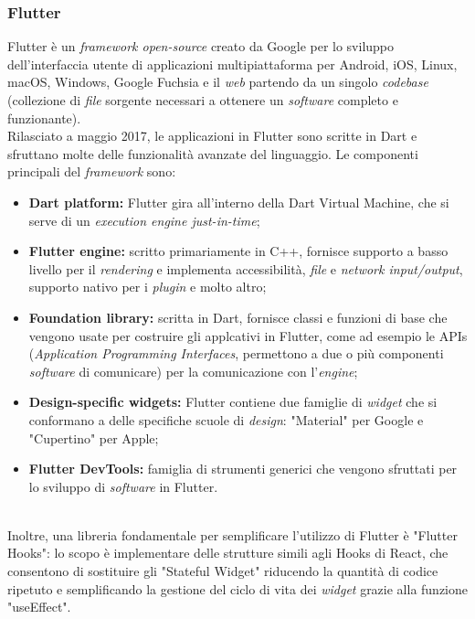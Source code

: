 \subsubsection{Flutter}
Flutter è un \textit{framework open-source} creato da Google per lo sviluppo dell'interfaccia utente di applicazioni multipiattaforma per Android, iOS, Linux, macOS, Windows, Google Fuchsia e il \textit{web} partendo da un singolo \textit{codebase} (collezione di \textit{file} sorgente necessari a ottenere un \textit{software} completo e funzionante).\\
Rilasciato a maggio 2017, le applicazioni in Flutter sono scritte in Dart e sfruttano molte delle funzionalità avanzate del linguaggio. Le componenti principali del \textit{framework} sono:
\begin{itemize}
    \item \textbf{Dart platform:} Flutter gira all'interno della Dart Virtual Machine, che si serve di un \textit{execution engine just-in-time};
    \item \textbf{Flutter engine:} scritto primariamente in C++, fornisce supporto a basso livello per il \textit{rendering} e implementa accessibilità, \textit{file} e \textit{network input/output}, supporto nativo per i \textit{plugin} e molto altro;
    \item \textbf{Foundation library:} scritta in Dart, fornisce classi e funzioni di base che vengono usate per costruire gli applcativi in Flutter, come ad esempio le APIs (\textit{Application Programming Interfaces}, permettono a due o più componenti \textit{software} di comunicare) per la comunicazione con l'\textit{engine};
    \item \textbf{Design-specific widgets:} Flutter contiene due famiglie di \textit{widget} che si conformano a delle specifiche scuole di \textit{design}: "Material" per Google e "Cupertino" per Apple;
    \item \textbf{Flutter DevTools:} famiglia di strumenti generici che vengono sfruttati per lo sviluppo di \textit{software} in Flutter.
\end{itemize}
~\\
Inoltre, una libreria fondamentale per semplificare l'utilizzo di Flutter è "Flutter Hooks": lo scopo è implementare delle strutture simili agli Hooks di React, che consentono di sostituire gli "Stateful Widget" riducendo la quantità di codice ripetuto e semplificando la gestione del ciclo di vita dei \textit{widget} grazie alla funzione "useEffect".

